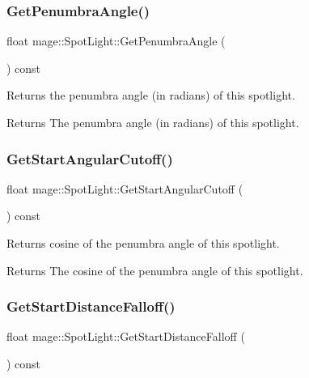 \subsubsection{\texorpdfstring{Get\+Penumbra\+Angle()}{GetPenumbraAngle()}}
{\footnotesize\ttfamily float mage\+::\+Spot\+Light\+::\+Get\+Penumbra\+Angle (\begin{DoxyParamCaption}{ }\end{DoxyParamCaption}) const}

Returns the penumbra angle (in radians) of this spotlight.

\begin{DoxyReturn}{Returns}
The penumbra angle (in radians) of this spotlight. 
\end{DoxyReturn}
\hypertarget{classmage_1_1_spot_light_af91cd33b82eb12163ae8b4e9e459ad0c}{}\label{classmage_1_1_spot_light_af91cd33b82eb12163ae8b4e9e459ad0c} 
\subsubsection{\texorpdfstring{Get\+Start\+Angular\+Cutoff()}{GetStartAngularCutoff()}}
{\footnotesize\ttfamily float mage\+::\+Spot\+Light\+::\+Get\+Start\+Angular\+Cutoff (\begin{DoxyParamCaption}{ }\end{DoxyParamCaption}) const}

Returns cosine of the penumbra angle of this spotlight.

\begin{DoxyReturn}{Returns}
The cosine of the penumbra angle of this spotlight. 
\end{DoxyReturn}
\hypertarget{classmage_1_1_spot_light_a78ef6cc0ecd04cff8a4db9270e9ecb99}{}\label{classmage_1_1_spot_light_a78ef6cc0ecd04cff8a4db9270e9ecb99} 
\subsubsection{\texorpdfstring{Get\+Start\+Distance\+Falloff()}{GetStartDistanceFalloff()}}
{\footnotesize\ttfamily float mage\+::\+Spot\+Light\+::\+Get\+Start\+Distance\+Falloff (\begin{DoxyParamCaption}{ }\end{DoxyParamCaption}) const}

